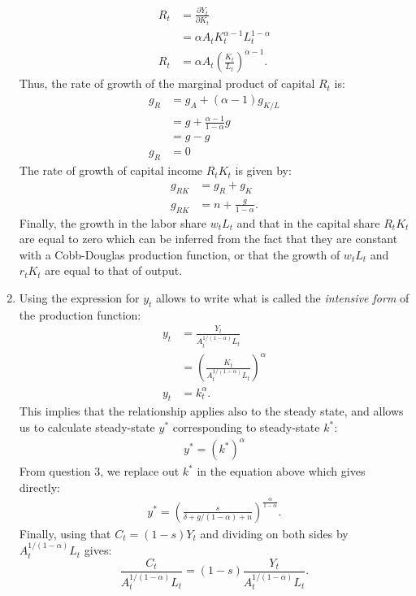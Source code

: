 \documentclass[]{book}
\theoremstyle{definition}
\theoremstyle{definition}
\theoremstyle{definition}
\theoremstyle{remark}
\begin{document}
\begin{enumerate}
\[  \begin{aligned}
  R_t&=\frac{\partial Y_t}{\partial K_t}\\
  &=\alpha A_t K_t^{\alpha-1}L_t^{1-\alpha}\\
  R_t&= \alpha A_t \left(\frac{K_t}{L_t}\right)^{\alpha-1}.
  \end{aligned}
  \] Thus, the rate of growth of the marginal product of capital \(R_t\)
  is: \[
  \begin{aligned}
  g_R&=g_A+(\alpha-1) g_{K/L}\\
  &=g +\frac{\alpha-1}{1-\alpha}g\\
  &=g-g\\
  g_R&=0
  \end{aligned}
  \] The rate of growth of capital income \(R_t K_t\) is given by: \[
  \begin{aligned}
  g_{R K}&=g_R + g_K \\
  g_{R K}&= n + \frac{g}{1-\alpha}.
  \end{aligned}
  \] Finally, the growth in the labor share \(w_t L_t\) and that in the
  capital share \(R_t K_t\) are equal to zero which can be inferred from
  the fact that they are constant with a Cobb-Douglas production
  function, or that the growth of \(w_t L_t\) and \(r_t K_t\) are equal
  to that of output.
\item
  Using the expression for \(y_t\) allows to write what is called the
  \emph{intensive form} of the production function: \[
  \begin{aligned}
  y_t&=\frac{Y_t}{A_t^{1/(1-\alpha)} L_t}\\
  &= \left(\frac{K_t}{A_t^{1/(1-\alpha)}L_t}\right)^\alpha\\
  y_t&= k_t^\alpha.
  \end{aligned}
  \] This implies that the relationship applies also to the steady
  state, and allows us to calculate steady-state \(y^{*}\) corresponding
  to steady-state \(k^{*}\): \[
  \begin{aligned}
  y^*=\left(k^*\right)^\alpha
  \end{aligned}
  \] From question 3, we replace out \(k^{*}\) in the equation above
  which gives directly: \[
  \begin{aligned}
  \boxed{y^{*}=\left(\frac{s}{\delta+g/(1-\alpha)+n}\right)^{\frac{\alpha}{1-\alpha}}}.
  \end{aligned}
  \] Finally, using that \(C_t = (1-s)Y_t\) and dividing on both sides
  by \(A_t^{1/(1-\alpha)} L_t\) gives:
  \[\frac{C_t}{A_t^{1/(1-\alpha)} L_t}=(1-s)\frac{Y_t}{A_t^{1/(1-\alpha)} L_t}.\]

\end{enumerate}
\end{document}
